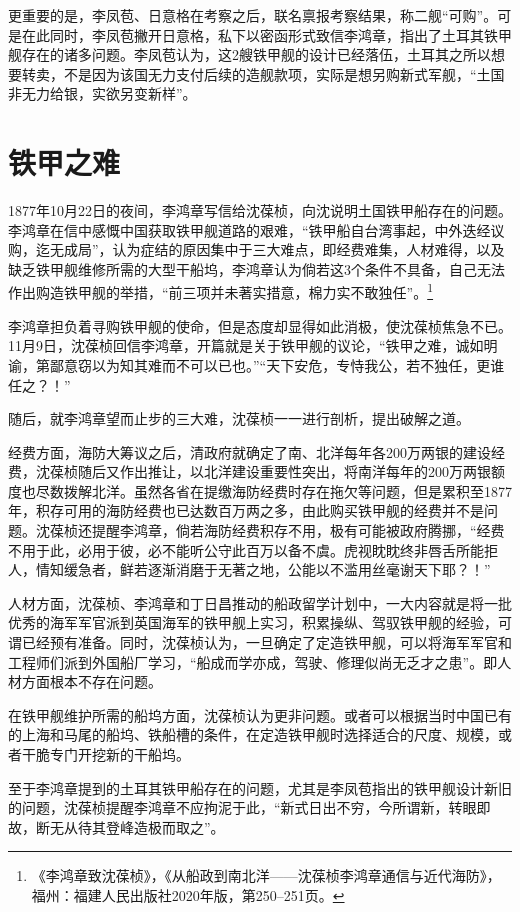 \documentclass[12pt,UTF8]{ctexbook}
\begin{document}
更重要的是，李凤苞、日意格在考察之后，联名禀报考察结果，称二舰“可购”。可是在此同时，李凤苞撇开日意格，私下以密函形式致信李鸿章，指出了土耳其铁甲舰存在的诸多问题。李凤苞认为，这2艘铁甲舰的设计已经落伍，土耳其之所以想要转卖，不是因为该国无力支付后续的造舰款项，实际是想另购新式军舰，“土国非无力给银，实欲另变新样”。

\section{铁甲之难}

1877年10月22日的夜间，李鸿章写信给沈葆桢，向沈说明土国铁甲船存在的问题。李鸿章在信中感慨中国获取铁甲舰道路的艰难，“铁甲船自台湾事起，中外迭经议购，迄无成局”，认为症结的原因集中于三大难点，即经费难集，人材难得，以及缺乏铁甲舰维修所需的大型干船坞，李鸿章认为倘若这3个条件不具备，自己无法作出购造铁甲舰的举措，“前三项并未著实措意，棉力实不敢独任”。\footnote{《李鸿章致沈葆桢》，《从船政到南北洋——沈葆桢李鸿章通信与近代海防》，福州：福建人民出版社2020年版，第250--251页。}

李鸿章担负着寻购铁甲舰的使命，但是态度却显得如此消极，使沈葆桢焦急不已。11月9日，沈葆桢回信李鸿章，开篇就是关于铁甲舰的议论，“铁甲之难，诚如明谕，第鄙意窃以为知其难而不可以已也。”“天下安危，专恃我公，若不独任，更谁任之？！”

随后，就李鸿章望而止步的三大难，沈葆桢一一进行剖析，提出破解之道。

经费方面，海防大筹议之后，清政府就确定了南、北洋每年各200万两银的建设经费，沈葆桢随后又作出推让，以北洋建设重要性突出，将南洋每年的200万两银额度也尽数拨解北洋。虽然各省在提缴海防经费时存在拖欠等问题，但是累积至1877年，积存可用的海防经费也已达数百万两之多，由此购买铁甲舰的经费并不是问题。沈葆桢还提醒李鸿章，倘若海防经费积存不用，极有可能被政府腾挪，“经费不用于此，必用于彼，必不能听公守此百万以备不虞。虎视眈眈终非唇舌所能拒人，情知缓急者，鲜若逐渐消磨于无著之地，公能以不滥用丝毫谢天下耶？！”

人材方面，沈葆桢、李鸿章和丁日昌推动的船政留学计划中，一大内容就是将一批优秀的海军军官派到英国海军的铁甲舰上实习，积累操纵、驾驭铁甲舰的经验，可谓已经预有准备。同时，沈葆桢认为，一旦确定了定造铁甲舰，可以将海军军官和工程师们派到外国船厂学习，“船成而学亦成，驾驶、修理似尚无乏才之患”。即人材方面根本不存在问题。

在铁甲舰维护所需的船坞方面，沈葆桢认为更非问题。或者可以根据当时中国已有的上海和马尾的船坞、铁船槽的条件，在定造铁甲舰时选择适合的尺度、规模，或者干脆专门开挖新的干船坞。

至于李鸿章提到的土耳其铁甲船存在的问题，尤其是李凤苞指出的铁甲舰设计新旧的问题，沈葆桢提醒李鸿章不应拘泥于此，“新式日出不穷，今所谓新，转眼即故，断无从待其登峰造极而取之”。
\end{document}
